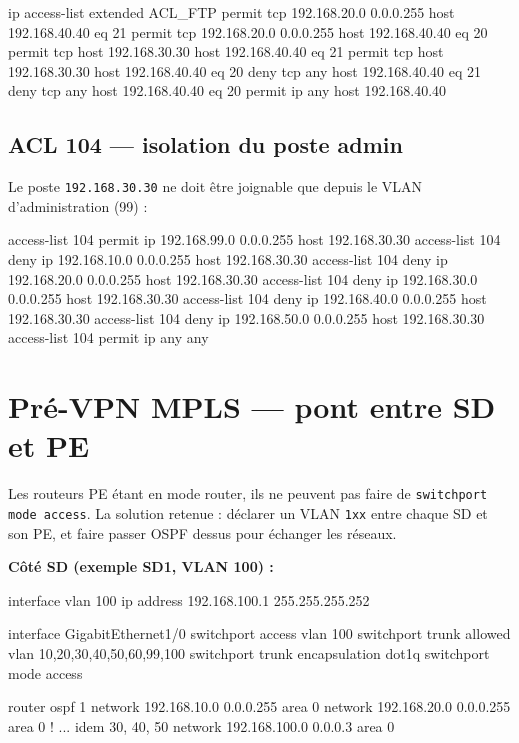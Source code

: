 \documentclass[11pt,a4paper]{article}
\begin{document}
\begin{ciscobox}
ip access-list extended ACL_FTP
 permit tcp 192.168.20.0 0.0.0.255 host 192.168.40.40 eq 21
 permit tcp 192.168.20.0 0.0.0.255 host 192.168.40.40 eq 20
 permit tcp host 192.168.30.30      host 192.168.40.40 eq 21
 permit tcp host 192.168.30.30      host 192.168.40.40 eq 20
 deny   tcp any                     host 192.168.40.40 eq 21
 deny   tcp any                     host 192.168.40.40 eq 20
 permit ip  any                     host 192.168.40.40
\end{ciscobox}

\subsection{ACL 104 — isolation du poste admin}

Le poste \texttt{192.168.30.30} ne doit être joignable que depuis le VLAN d'administration (99) :

\begin{ciscobox}
access-list 104 permit ip 192.168.99.0 0.0.0.255 host 192.168.30.30
access-list 104 deny   ip 192.168.10.0 0.0.0.255 host 192.168.30.30
access-list 104 deny   ip 192.168.20.0 0.0.0.255 host 192.168.30.30
access-list 104 deny   ip 192.168.30.0 0.0.0.255 host 192.168.30.30
access-list 104 deny   ip 192.168.40.0 0.0.0.255 host 192.168.30.30
access-list 104 deny   ip 192.168.50.0 0.0.0.255 host 192.168.30.30
access-list 104 permit ip any any
\end{ciscobox}

\section{Pré-VPN MPLS — pont entre SD et PE}

Les routeurs PE étant en mode router, ils ne peuvent pas faire de \texttt{switchport mode access}. La solution retenue : déclarer un VLAN \texttt{1xx} entre chaque SD et son PE, et faire passer OSPF dessus pour échanger les réseaux.

\textbf{Côté SD (exemple SD1, VLAN 100) :}
\begin{ciscobox}
interface vlan 100
 ip address 192.168.100.1 255.255.255.252

interface GigabitEthernet1/0
 switchport access vlan 100
 switchport trunk allowed vlan 10,20,30,40,50,60,99,100
 switchport trunk encapsulation dot1q
 switchport mode access

router ospf 1
 network 192.168.10.0  0.0.0.255 area 0
 network 192.168.20.0  0.0.0.255 area 0
 ! ... idem 30, 40, 50
 network 192.168.100.0 0.0.0.3   area 0
\end{ciscobox}
\end{document}
